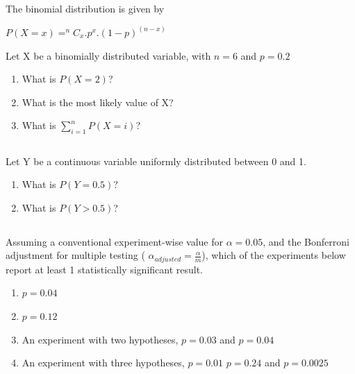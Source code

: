 \documentclass[twocolumn]{article}
\begin{document}
The binomial distribution is given by 

\begin{center}
    $P(X = x) = ^nC_x.p^x.(1-p)^{(n-x)}$
\end{center}

Let X be a binomially distributed variable, with $n=6$ and $p=0.2$

\begin{enumerate}
    \item What is $P(X=2)$?
    \item What is the most likely value of X?
    \item What is $\sum_{i=1}^n P(X = i)$?
\end{enumerate}

\subsection{}

Let Y be a continuous variable uniformly distributed between 0 and 1.

\begin{enumerate}
    \item What is $P(Y = 0.5)$?
    \item What is $P(Y > 0.5)$?
\end{enumerate}

\subsection{}

Assuming a conventional experiment-wise value for $ \alpha = 0.05 $, and the Bonferroni adjustment for multiple testing ( $\alpha_{adjusted} = \frac{\alpha}{m}$), which of the experiments below report at least 1 statistically significant result.

\begin{enumerate}
    \item $ p = 0.04 $
    \item $ p = 0.12 $
    \item An experiment with two hypotheses, $p = 0.03$ and $p=0.04 $
    \item An experiment with three hypotheses, $p = 0.01$ $p=0.24$ and $p=0.0025 $ 
\end{enumerate}

\subsection{}
\end{document}
